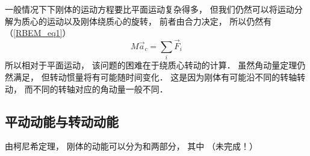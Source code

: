 

一般情况下下刚体的运动方程要比平面运动复杂得多， 但我们仍然可以将运动分解为质心的运动以及刚体绕质心的旋转， 前者由合力决定， 所以仍然有（\autoref{RBEM_eq1}）
\begin{equation}
M\vec a_c = \sum_i \vec F_i
\end{equation}
所以相对于平面运动， 该问题的困难在于绕质心转动的计算． 虽然角动量定理仍然满足， 但转动惯量将有可能随时间变化． 这是因为刚体有可能沿不同的转轴转动， 而不同的转轴对应的角动量一般不同．


\subsection{平动动能与转动动能}
由柯尼希定理， 刚体的动能可以分为和两部分， 其中
（未完成！）
